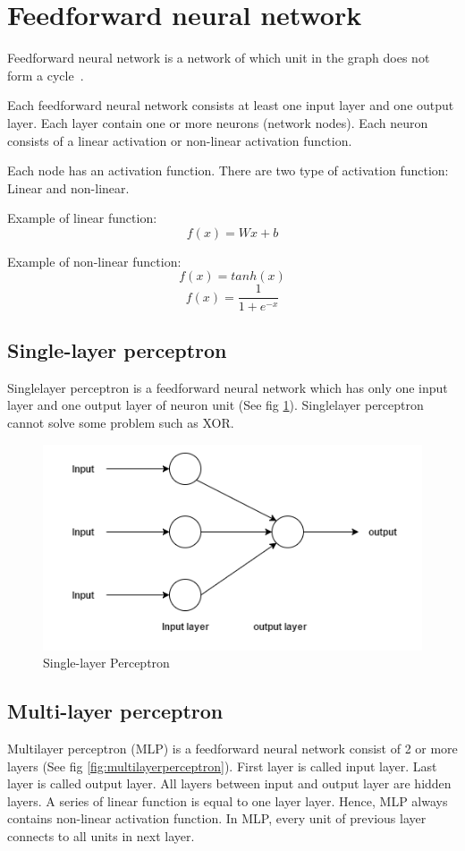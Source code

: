 \section{Feedforward neural network}
Feedforward neural network is a network of which unit in the graph does not form a cycle~\cite{deeplearning-book}.

Each feedforward neural network consists at least one input layer and one output layer. 
Each layer contain one or more neurons (network nodes). 
Each neuron consists of a linear activation or non-linear activation function.

Each node has an activation function. There are two type of activation function: Linear and non-linear.

Example of linear function: \\

\begin{equation} \label{eq:linearmlp}
{f(x) = Wx + b }
\end{equation}

Example of non-linear function: \\
\[f(x) = tanh(x) \]
\[f(x) =\frac{1}{1+e^{-x}} \]

\subsection{Single-layer perceptron}
Singlelayer perceptron is a feedforward neural network which has only one input layer and one output layer of neuron unit (See fig \ref{fig:singleperceptron}). Singlelayer perceptron cannot solve some problem such as XOR.
\begin{figure}[H]
	\centering
	\includegraphics[width=0.7\linewidth]{figure/singleperceptron}
	\caption[Single-layer Perceptron]{Single-layer Perceptron}
	\label{fig:singleperceptron}
\end{figure}



\subsection{Multi-layer perceptron}
Multilayer perceptron (MLP) is a feedforward neural network consist of 2 or more layers (See fig \ref{fig:multilayerperceptron}). 
First layer is called input layer. 
Last layer is called output layer. 
All layers between input and output layer are hidden layers. 
A series of linear function is equal to one layer layer. 
Hence, MLP always contains non-linear activation function. 
In MLP, every unit of previous layer connects to all units in next layer.

